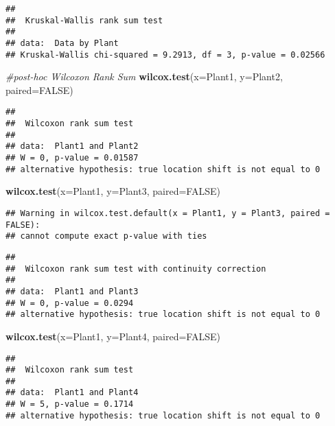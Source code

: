 \documentclass[]{article}
\newenvironment{Shaded}{\begin{snugshade}}{\end{snugshade}}
\newcommand{\KeywordTok}[1]{\textcolor[rgb]{0.13,0.29,0.53}{\textbf{#1}}}
\newcommand{\DataTypeTok}[1]{\textcolor[rgb]{0.13,0.29,0.53}{#1}}
\newcommand{\CommentTok}[1]{\textcolor[rgb]{0.56,0.35,0.01}{\textit{#1}}}
\newcommand{\OtherTok}[1]{\textcolor[rgb]{0.56,0.35,0.01}{#1}}
\newcommand{\NormalTok}[1]{#1}
\begin{document}
\begin{verbatim}
## 
##  Kruskal-Wallis rank sum test
## 
## data:  Data by Plant
## Kruskal-Wallis chi-squared = 9.2913, df = 3, p-value = 0.02566
\end{verbatim}

\begin{Shaded}
\begin{Highlighting}[]
\CommentTok{#post-hoc Wilcoxon Rank Sum}
\KeywordTok{wilcox.test}\NormalTok{(}\DataTypeTok{x=}\NormalTok{Plant1, }\DataTypeTok{y=}\NormalTok{Plant2, }\DataTypeTok{paired=}\OtherTok{FALSE}\NormalTok{)}
\end{Highlighting}
\end{Shaded}

\begin{verbatim}
## 
##  Wilcoxon rank sum test
## 
## data:  Plant1 and Plant2
## W = 0, p-value = 0.01587
## alternative hypothesis: true location shift is not equal to 0
\end{verbatim}

\begin{Shaded}
\begin{Highlighting}[]
\KeywordTok{wilcox.test}\NormalTok{(}\DataTypeTok{x=}\NormalTok{Plant1, }\DataTypeTok{y=}\NormalTok{Plant3, }\DataTypeTok{paired=}\OtherTok{FALSE}\NormalTok{)}
\end{Highlighting}
\end{Shaded}

\begin{verbatim}
## Warning in wilcox.test.default(x = Plant1, y = Plant3, paired = FALSE):
## cannot compute exact p-value with ties
\end{verbatim}

\begin{verbatim}
## 
##  Wilcoxon rank sum test with continuity correction
## 
## data:  Plant1 and Plant3
## W = 0, p-value = 0.0294
## alternative hypothesis: true location shift is not equal to 0
\end{verbatim}

\begin{Shaded}
\begin{Highlighting}[]
\KeywordTok{wilcox.test}\NormalTok{(}\DataTypeTok{x=}\NormalTok{Plant1, }\DataTypeTok{y=}\NormalTok{Plant4, }\DataTypeTok{paired=}\OtherTok{FALSE}\NormalTok{)}
\end{Highlighting}
\end{Shaded}

\begin{verbatim}
## 
##  Wilcoxon rank sum test
## 
## data:  Plant1 and Plant4
## W = 5, p-value = 0.1714
## alternative hypothesis: true location shift is not equal to 0
\end{verbatim}
\end{document}
